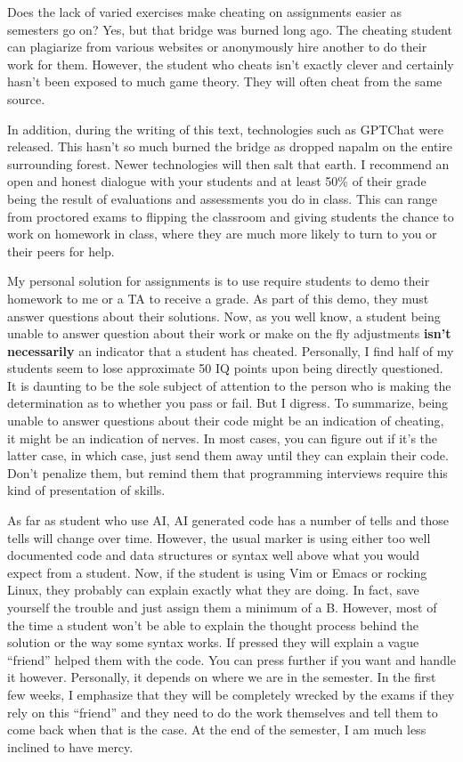 Does the lack of varied exercises make cheating on assignments easier as semesters go on?  Yes, but that bridge was burned long ago.  
The cheating student can plagiarize from various websites or anonymously hire another to do their work for them.
However, the student who cheats isn't exactly clever and certainly hasn't been exposed to much game theory.  
They will often cheat from the same source.  

In addition, during the writing of this text, technologies such as GPTChat were released.  This hasn't so much burned the bridge as dropped napalm on the entire surrounding forest.  Newer technologies will then salt that earth. I recommend an open and honest dialogue with your students and at least 50\% of their grade being the result of evaluations and assessments you do in class.  This can range from proctored exams to flipping the classroom and giving students the chance to work  on homework in class, where they are much more likely to turn to you or their peers for help.

My personal solution for assignments is to use require students to demo their homework to me or a TA to receive a grade.  As part of this demo, they must answer questions about their solutions.  Now, as you well know, a student being unable to answer question about their work or make on the fly adjustments \textbf{isn't necessarily} an indicator that a student has cheated.  Personally, I find half of my students seem to lose approximate 50 IQ points upon being directly questioned.  It is daunting to be the sole subject of attention to the person who is making the determination as to whether you pass or fail.  But I digress.  To summarize, being unable to answer questions about their code might be an indication of cheating, it might be an indication of nerves.  In most cases, you can figure out if it's the latter case, in which case, just send them away until they can explain their code.  Don't penalize them, but remind them that programming interviews require this kind of presentation of skills. 

As far as student who use AI, AI generated code has a number of tells and those tells will change over time.  However, the usual marker is using either too well documented code and data structures or syntax well above what you would expect from a student.  Now, if the student is using Vim or Emacs or rocking Linux, they probably  can explain exactly what they are doing.  In fact, save yourself the trouble and just assign them a minimum of a B.  However, most of the time a student won't be able to explain the thought process behind the solution or the way some syntax works.  If pressed they will explain a vague ``friend'' helped them with the code.  You can press further if you want and handle it however.  Personally, it depends on where we are in the semester.  In the first few weeks, I emphasize that they will be completely wrecked by the exams if they rely on this ``friend'' and they need to do the work themselves and tell them to come back when that is the case.  At the end of the semester, I am much less inclined to have mercy.


